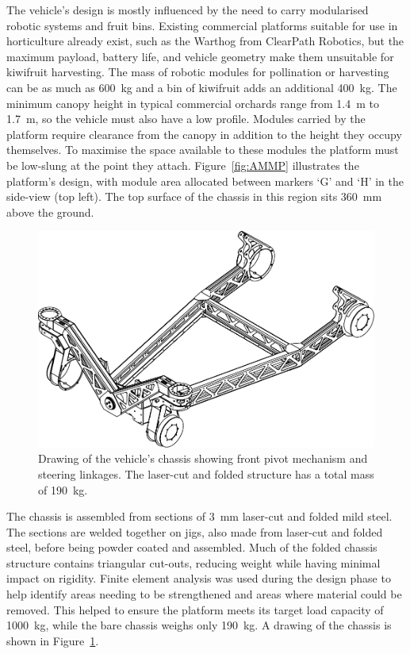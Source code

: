 \documentclass[preprint,authoryear,12pt]{elsarticle}
\begin{document}
        The vehicle's design is mostly influenced by the need to carry modularised robotic systems and fruit bins.
        Existing commercial platforms suitable for use in horticulture already exist, such as the Warthog from ClearPath Robotics, but the maximum payload, battery life, and vehicle geometry make them unsuitable for kiwifruit harvesting.
        The mass of robotic modules for pollination or harvesting can be as much as \SI{600}{\kilo\gram} and a bin of kiwifruit adds an additional \SI{400}{\kilo\gram}.
        The minimum canopy height in typical commercial orchards range from \SI{1.4}{\meter} to \SI{1.7}{\meter}, so the vehicle must also have a low profile.
        Modules carried by the platform require clearance from the canopy in addition to the height they occupy themselves.
        To maximise the space available to these modules the platform must be low-slung at the point they attach.
        Figure~\ref{fig:AMMP} illustrates the platform's design, with module area allocated between markers `G' and `H' in the side-view (top left).
        The top surface of the chassis in this region sits \SI{360}{\milli\meter} above the ground.

        \begin{figure}[htb]
            \centering
            \includegraphics[width=0.6\linewidth]{imgs/profile_views/AMMP-Chassis-1-20.pdf}
            \caption{Drawing of the vehicle's chassis showing front pivot mechanism and steering linkages. The laser-cut and folded structure has a total mass of \SI{190}{\kilo\gram}.}
            \label{fig:AMMPChassis}
        \end{figure}

        The chassis is assembled from sections of \SI{3}{\milli\meter} laser-cut and folded mild steel.
        The sections are welded together on jigs, also made from laser-cut and folded steel, before being powder coated and assembled.
        Much of the folded chassis structure contains triangular cut-outs, reducing weight while having minimal impact on rigidity.
        Finite element analysis was used during the design phase to help identify areas needing to be strengthened and areas where material could be removed.
        This helped to ensure the platform meets its target load capacity of \SI{1000}{\kilo\gram}, while the bare chassis weighs only \SI{190}{\kilo\gram}.
        A drawing of the chassis is shown in Figure~\ref{fig:AMMPChassis}.
\end{document}
